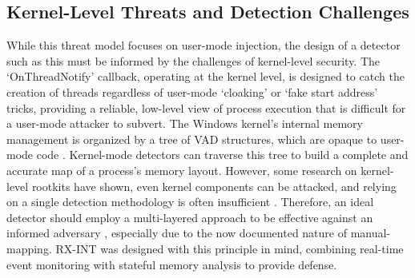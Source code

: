 \documentclass[journal]{IEEEtran}
\begin{document}
\subsection{Kernel-Level Threats and Detection Challenges}
While this threat model focuses on user-mode injection, the design of a detector such as this must be informed by the challenges of kernel-level security. The `OnThreadNotify' callback, operating at the kernel level, is designed to catch the creation of threads regardless of user-mode `cloaking' or `fake start address' tricks, providing a reliable, low-level view of process execution that is difficult for a user-mode attacker to subvert. The Windows kernel's internal memory management is organized by a tree of VAD structures, which are opaque to user-mode code \cite{Russinovich2022}. Kernel-mode detectors can traverse this tree to build a complete and accurate map of a process's memory layout. However, some research on kernel-level rootkits have shown, even kernel components can be attacked, and relying on a single detection methodology is often insufficient \cite{kruegel2004detecting} \cite{nadim2023kernellevelrootkitdetectionprevention}. Therefore, an ideal detector should employ a multi-layered approach to be effective against an informed adversary \cite{nistDiD}, especially due to the now documented nature of manual-mapping. RX-INT was designed with this principle in mind, combining real-time event monitoring with stateful memory analysis to provide defense. 
\end{document}
